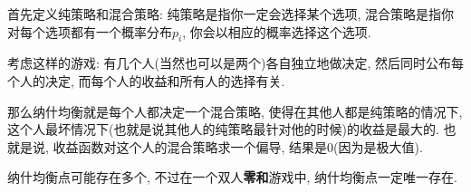 首先定义纯策略和混合策略: 纯策略是指你一定会选择某个选项, 混合策略是指你对每个选项都有一个概率分布$p_i$, 你会以相应的概率选择这个选项.

考虑这样的游戏: 有几个人(当然也可以是两个)各自独立地做决定, 然后同时公布每个人的决定, 而每个人的收益和所有人的选择有关.

那么纳什均衡就是每个人都决定一个混合策略, 使得在其他人都是纯策略的情况下, 这个人最坏情况下(也就是说其他人的纯策略最针对他的时候)的收益是最大的. 也就是说, 收益函数对这个人的混合策略求一个偏导, 结果是0(因为是极大值).

纳什均衡点可能存在多个, 不过在一个双人\textbf{零和}游戏中, 纳什均衡点一定唯一存在.